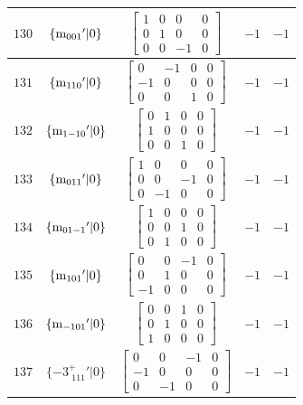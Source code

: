 \documentclass[fleqn,8pt]{jsarticle}
\begin{document}
\begin{longtable}{ccccc}
$ 130 $ & $ \{{\rm m}_{001}{}'|0\} $ & $ \begin{bmatrix} 1 & 0 & 0 & 0 \\ 0 & 1 & 0 & 0 \\ 0 & 0 & -1 & 0 \end{bmatrix} $ & $ -1 $ & $ -1 $ \\ \hline
$ 131 $ & $ \{{\rm m}_{110}{}'|0\} $ & $ \begin{bmatrix} 0 & -1 & 0 & 0 \\ -1 & 0 & 0 & 0 \\ 0 & 0 & 1 & 0 \end{bmatrix} $ & $ -1 $ & $ -1 $ \\ \hline
$ 132 $ & $ \{{\rm m}_{1-10}{}'|0\} $ & $ \begin{bmatrix} 0 & 1 & 0 & 0 \\ 1 & 0 & 0 & 0 \\ 0 & 0 & 1 & 0 \end{bmatrix} $ & $ -1 $ & $ -1 $ \\ \hline
$ 133 $ & $ \{{\rm m}_{011}{}'|0\} $ & $ \begin{bmatrix} 1 & 0 & 0 & 0 \\ 0 & 0 & -1 & 0 \\ 0 & -1 & 0 & 0 \end{bmatrix} $ & $ -1 $ & $ -1 $ \\ \hline
$ 134 $ & $ \{{\rm m}_{01-1}{}'|0\} $ & $ \begin{bmatrix} 1 & 0 & 0 & 0 \\ 0 & 0 & 1 & 0 \\ 0 & 1 & 0 & 0 \end{bmatrix} $ & $ -1 $ & $ -1 $ \\ \hline
$ 135 $ & $ \{{\rm m}_{101}{}'|0\} $ & $ \begin{bmatrix} 0 & 0 & -1 & 0 \\ 0 & 1 & 0 & 0 \\ -1 & 0 & 0 & 0 \end{bmatrix} $ & $ -1 $ & $ -1 $ \\ \hline
$ 136 $ & $ \{{\rm m}_{-101}{}'|0\} $ & $ \begin{bmatrix} 0 & 0 & 1 & 0 \\ 0 & 1 & 0 & 0 \\ 1 & 0 & 0 & 0 \end{bmatrix} $ & $ -1 $ & $ -1 $ \\ \hline
$ 137 $ & $ \{-3^{+}_{\,\,111}{}'|0\} $ & $ \begin{bmatrix} 0 & 0 & -1 & 0 \\ -1 & 0 & 0 & 0 \\ 0 & -1 & 0 & 0 \end{bmatrix} $ & $ -1 $ & $ -1 $ \\ \hline

\end{longtable}
\end{document}
